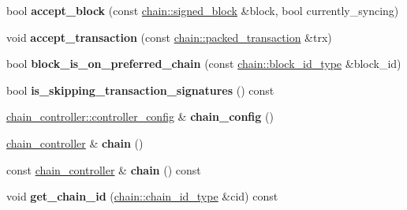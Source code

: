 \begin{DoxyCompactItemize}
\item 
\mbox{\label{classaacio_1_1chain__plugin_a42f4f30fa425b236e3b7b3418f730a25}} 
bool {\bfseries accept\+\_\+block} (const \mbox{\hyperlink{structaacio_1_1chain_1_1signed__block}{chain\+::signed\+\_\+block}} \&block, bool currently\+\_\+syncing)
\item 
\mbox{\label{classaacio_1_1chain__plugin_afe733698ae3d090f05d977eebdeaa3ea}} 
void {\bfseries accept\+\_\+transaction} (const \mbox{\hyperlink{structaacio_1_1chain_1_1packed__transaction}{chain\+::packed\+\_\+transaction}} \&trx)
\item 
\mbox{\label{classaacio_1_1chain__plugin_a8e785e62854771010251dd942aa73899}} 
bool {\bfseries block\+\_\+is\+\_\+on\+\_\+preferred\+\_\+chain} (const \mbox{\hyperlink{classfc_1_1sha256}{chain\+::block\+\_\+id\+\_\+type}} \&block\+\_\+id)
\item 
\mbox{\label{classaacio_1_1chain__plugin_a88ce9f038a9bf62b043f9b8b06f679a6}} 
bool {\bfseries is\+\_\+skipping\+\_\+transaction\+\_\+signatures} () const
\item 
\mbox{\label{classaacio_1_1chain__plugin_a47d688992e40e54b00ed46917239624c}} 
\mbox{\hyperlink{structaacio_1_1chain_1_1chain__controller_1_1controller__config}{chain\+\_\+controller\+::controller\+\_\+config}} \& {\bfseries chain\+\_\+config} ()
\item 
\mbox{\label{classaacio_1_1chain__plugin_a78565ed2e64a67fdcd188661bfac0ace}} 
\mbox{\hyperlink{classaacio_1_1chain_1_1chain__controller}{chain\+\_\+controller}} \& {\bfseries chain} ()
\item 
\mbox{\label{classaacio_1_1chain__plugin_a60c17ca348103b2fd21628780124138b}} 
const \mbox{\hyperlink{classaacio_1_1chain_1_1chain__controller}{chain\+\_\+controller}} \& {\bfseries chain} () const
\item 
\mbox{\label{classaacio_1_1chain__plugin_a4f43d6472d06167d0eee9997ef902c4c}} 
void {\bfseries get\+\_\+chain\+\_\+id} (\mbox{\hyperlink{classfc_1_1sha256}{chain\+::chain\+\_\+id\+\_\+type}} \&cid) const
\end{DoxyCompactItemize}
